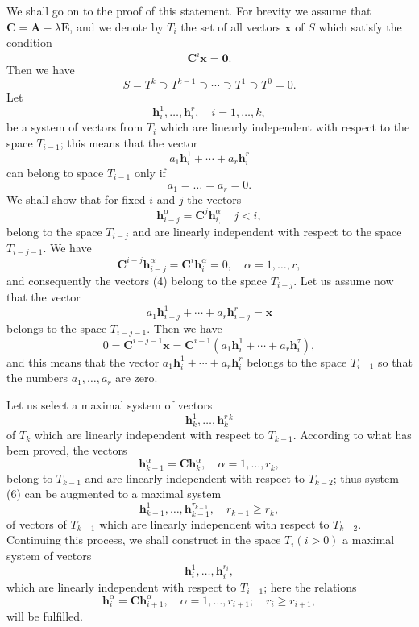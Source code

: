 \documentclass[10pt,a5paper]{book}
\makeatletter
\theoremstyle{plain}
\theoremstyle{definition}
\theoremstyle{remark}
\renewenvironment{proof}[1][\proofname]{\par
  \pushQED{\qed}%
  \normalfont\topsep6\p@\@plus6\p@\relax
  \trivlist
  \item\relax{\itshape #1\@addpunct{.}}\hspace\labelsep\ignorespaces
}{\popQED\endtrivlist\@endpefalse}
\makeatother
\begin{document}
\begin{proof}
We shall go on to the proof of this statement. For brevity we assume that $\mathbf{C}=\mathbf{A}-\lambda \mathbf{E}$, and we denote by $T_{i}$ the set of all vectors $\mathbf{x}$ of $S$ which satisfy the condition
\[
\mathbf{C}^{i} \mathbf{x}=\mathbf{0} .
\]
Then we have
\[
S=T^{k} \supset T^{k-1} \supset \cdots \supset T^{1} \supset T^{0}=0 .
\]
Let
\[
\mathbf{h}_{i}^{1}, \ldots, \mathbf{h}_{i}^{r}, \quad i=1, \ldots, k,
\]
be a system of vectors from $T_{i}$ which are linearly independent with respect to the space $T_{i-1}$; this means that the vector
\[
a_{1} \mathbf{h}_{i}^{1}+\cdots+a_{r} \mathbf{h}_{i}^{r}
\]
can belong to space $T_{i-1}$ only if
\[
a_{1}=\ldots=a_{r}=0 .
\]
We shall show that for fixed $i$ and $j$ the vectors
\begin{equation*}
\mathbf{h}_{i-j}^{\alpha}=\mathbf{C}^{j} \mathbf{h}_{i,}^{\alpha} \quad j<i, \tag{4}
\end{equation*}
belong to the space $T_{i-j}$ and are linearly independent with respect to the space $T_{i-j-1}$. We have
\[
\mathbf{C}^{i-j} \mathbf{h}_{i-j}^{\alpha}=\mathbf{C}^{i} \mathbf{h}_{i}^{\alpha}=0, \quad \alpha=1, \ldots, r,
\]
and consequently the vectors (4) belong to the space $T_{i-j}$. Let us assume now that the vector
\[
a_{1} \mathbf{h}_{i-j}^{1}+\cdots+a_{r} \mathbf{h}_{i-j}^{r}=\mathbf{x}
\]
belongs to the space $T_{i-j-1}$. Then we have
\[
0=\mathbf{C}^{i-j-1} \mathbf{x}=\mathbf{C}^{i-1}\left(a_{1} \mathbf{h}_{i}^{1}+\cdots+a_{r} \mathbf{h}_{i}^{\tau}\right),
\]
and this means that the vector $a_{1} \mathbf{h}_{i}^{1}+\cdots+a_{r} \mathbf{h}_{i}^{r}$ belongs to the space $T_{i-1}$ so that the numbers $a_{1}, \ldots, a_{r}$ are zero.

Let us select a maximal system of vectors
\begin{equation*}
\mathbf{h}_{k}^{1}, \ldots, \mathbf{h}_{k}^{r}{ }^{k} \tag{5}
\end{equation*}
of $T_{k}$ which are linearly independent with respect to $T_{k-1}$. According to what has been proved, the vectors
\begin{equation*}
\mathbf{h}_{k-1}^{\alpha}=\mathbf{C h}_{k}^{\alpha}, \quad \alpha=1, \ldots, r_{k}, \tag{6}
\end{equation*}
belong to $T_{k-1}$ and are linearly independent with respect to $T_{k-2}$; thus system (6) can be augmented to a maximal system
\begin{equation*}
\mathbf{h}_{k-1}^{1}, \ldots, \mathbf{h}_{k-1}^{\tau_{k-1}}, \quad r_{k-1} \geq r_{k}, \tag{7}
\end{equation*}
of vectors of $T_{k-1}$ which are linearly independent with respect to $T_{k-2}$. Continuing this process, we shall construct in the space $T_{i}(i>0)$ a maximal system of vectors
\begin{equation*}
\mathbf{h}_{i}^{1}, \ldots, \mathbf{h}_{i}^{r_{i}}, \tag{8}
\end{equation*}
which are linearly independent with respect to $T_{i-1}$; here the relations
\[
\mathbf{h}_{i}^{\alpha}=\mathbf{C h}_{i+1}^{\alpha}, \quad \alpha=1, \ldots, r_{i+1} ; \quad r_{i} \geq r_{i+1},
\]
will be fulfilled.


\end{proof}
\end{document}
